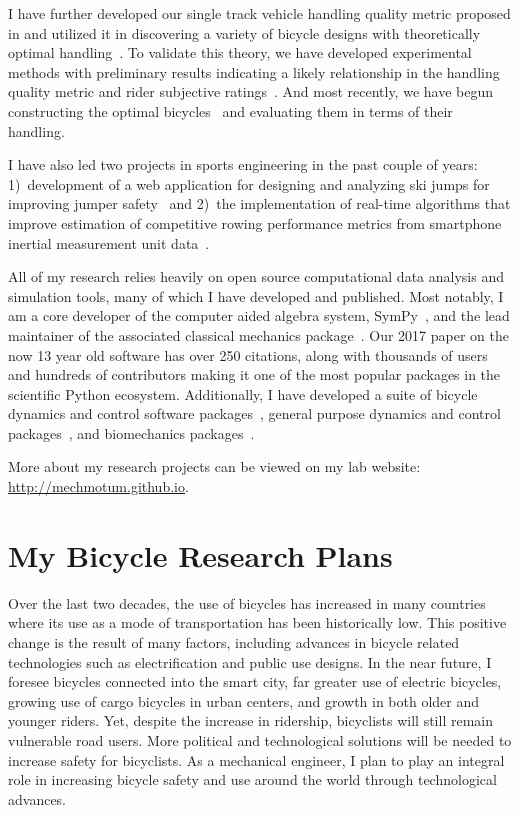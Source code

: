 \documentclass{article}
\begin{document}
I have further developed our single track vehicle handling quality metric
proposed in \cite{Hess2012} and utilized it in discovering a variety of bicycle
designs with theoretically optimal handling~\cite{Moore2016,Moore2019a}. To
validate this theory, we have developed experimental methods with preliminary
results indicating a likely relationship in the handling quality metric and
rider subjective ratings~\cite{Kresie2017}. And most recently, we have begun
constructing the optimal bicycles~\cite{Gilboa2019a} and evaluating them in
terms of their handling.

I have also led two projects in sports engineering in the past couple of years:
1)~development of a web application for designing and analyzing ski jumps for
improving jumper safety~\cite{Moore2018a,Cloud2019a} and 2)~the implementation
of real-time algorithms that improve estimation of competitive rowing
performance metrics from smartphone inertial measurement unit
data~\cite{Cloud2019b}.

All of my research relies heavily on open source computational data analysis
and simulation tools, many of which I have developed and published. Most
notably, I am a core developer of the computer aided algebra system,
SymPy~\cite{SymPyDevelopmentTeam2006}, and the lead maintainer of the
associated classical mechanics package~\cite{Gede2013}. Our 2017 paper
\cite{Meurer2017} on the now 13 year old software has over 250 citations, along
with thousands of users and hundreds of contributors making it one of the most
popular packages in the scientific Python ecosystem. Additionally, I have
developed a suite of bicycle dynamics and control software
packages~\cite{Moore2010b,Moore2011d,Moore2011a,Moore2011e}, general purpose
dynamics and control packages~\cite{Moore2014,Moore2011}, and biomechanics
packages~\cite{Dembia2011,Moore2011,Moore2011b,Moore2013b}.

More about my research projects can be viewed on my lab website:
\url{http://mechmotum.github.io}.

\section*{My Bicycle Research Plans}
%
Over the last two decades, the use of bicycles has increased in many countries
where its use as a mode of transportation has been historically low. This
positive change is the result of many factors, including advances in bicycle
related technologies such as electrification and public use designs. In the
near future, I foresee bicycles connected into the smart city, far greater use
of electric bicycles, growing use of cargo bicycles in urban centers, and
growth in both older and younger riders. Yet, despite the increase in
ridership, bicyclists will still remain vulnerable road users. More political
and technological solutions will be needed to increase safety for bicyclists.
As a mechanical engineer, I plan to play an integral role in increasing bicycle
safety and use around the world through technological advances.
\end{document}
